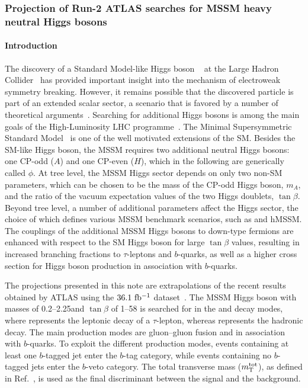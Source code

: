 \subsubsection{Projection of Run-2 ATLAS searches for MSSM heavy neutral Higgs bosons}
\paragraph{Introduction}

The discovery of a Standard Model-like Higgs boson ~\cite{ATLASHiggsJuly2012, CMSHiggsJuly2012}
at the Large Hadron Collider~\cite{LHC} has provided important insight into the mechanism of
electroweak symmetry breaking. However, it remains possible that the discovered particle is part
of an extended scalar sector, a scenario that is favored by a number of theoretical arguments~\cite{Djouadi:2005gj,Branco:2011iw}.
Searching for additional Higgs bosons is among the main goals of
the High-Luminosity LHC programme~\cite{ecfa15}. The Minimal Supersymmetric Standard
Model~\cite{Djouadi:2005gj,Fayet:1976et,Fayet:1977yc} is one of the well motivated extensions
of the SM\@. Besides the SM-like Higgs boson, the MSSM requires two additional neutral Higgs bosons:
one CP-odd ($A$) and one CP-even ($H$), which in the following are generically called $\phi$.
At tree level, the MSSM Higgs sector depends on only two non-SM parameters, which can be chosen
to be the mass of the CP-odd Higgs boson, $m_A$, and the ratio of the vacuum expectation values
of the two Higgs doublets, $\tan\beta$. Beyond tree level, a number of additional parameters
affect the Higgs sector, the choice of which defines various MSSM benchmark scenarios, such as \mhmodp and hMSSM.
The couplings of the additional MSSM Higgs bosons to down-type fermions are enhanced with respect to
the SM Higgs boson for large $\tan\beta$ values, resulting in increased branching fractions to
$\tau$-leptons and $b$-quarks, as well as a higher cross section for Higgs boson production
in association with $b$-quarks.

The projections presented in this note are extrapolations of the recent results obtained by ATLAS using
the $36.1~\mbox{fb$^{-1}$}$ \RunTwo dataset~\cite{ATLASRun2Ditau}.  The MSSM Higgs boson with masses of
0.2--2.25\TeV and $\tan\beta$ of 1--58 is searched for in the \lephad and \hadhad decay modes,
where \taulep represents the leptonic decay of a $\tau$-lepton, whereas \tauhad represents the hadronic decay.
The main production modes are gluon--gluon fusion and in association with $b$-quarks.
To exploit the different production modes, events containing at least one $b$-tagged jet enter the $b$-tag
category, while events containing no $b$-tagged jets enter the $b$-veto category. The total transverse
mass ($m_\textnormal{T}^\textnormal{tot}$), as defined in Ref.~\cite{ATLASRun2Ditau}, is used as the final discriminant between
the signal and the background.

